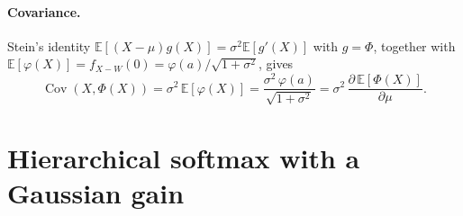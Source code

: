 \documentclass[letterpaper]{article}
\begin{document}
\paragraph{Covariance.} Stein's identity $\mathbb E[(X-\mu)g(X)]=\sigma^2\mathbb E[g'(X)]$ with $g=\Phi$, together with $\mathbb E[\varphi(X)]=f_{X-W}(0)=\varphi(a)/\sqrt{1+\sigma^2}$, gives
\begin{equation}
\operatorname{Cov}(X,\Phi(X))=\sigma^2\,\mathbb E[\varphi(X)]=\frac{\sigma^2\,\varphi(a)}{\sqrt{1+\sigma^2}}=\sigma^2\,\frac{\partial\,\mathbb E[\Phi(X)]}{\partial\mu}.
\label{E:cov}
\end{equation}

\section{Hierarchical softmax with a Gaussian gain}\label{S:HSM}
\end{document}
